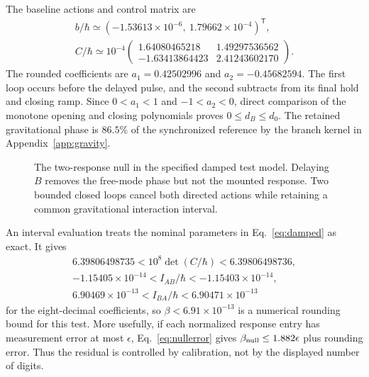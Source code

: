 The baseline actions and control matrix are
\begin{equation}
\begin{gathered}
b/\hbar\simeq(-1.53613\times10^{-6},\ 1.79662\times10^{-4})^{\mathsf T},\\
C/\hbar\simeq10^{-4}
\begin{pmatrix}
1.64080465218&1.49297536562\\
-1.63413864423&2.41243602170
\end{pmatrix}.
\end{gathered}
\label{eq:nullmatrix}
\end{equation}
The rounded coefficients are $a_1=0.42502996$ and $a_2=-0.45682594$. The first loop occurs before the delayed pulse, and the second subtracts from its final hold and closing ramp. Since $0<a_1<1$ and $-1<a_2<0$, direct comparison of the monotone opening and closing polynomials proves $0\le d_B\le d_0$. The retained gravitational phase is $86.5\%$ of the synchronized reference by the branch kernel in Appendix~\ref{app:gravity}.

\begin{figure}[t]
\centering
{}
\caption{The two-response null in the specified damped test model. Delaying $B$ removes the free-mode phase but not the mounted response. Two bounded closed loops cancel both directed actions while retaining a common gravitational interaction interval.}
\label{fig:nullpulses}
\end{figure}

An interval evaluation treats the nominal parameters in Eq.~\eqref{eq:damped} as exact. It gives
\begin{equation}
\begin{gathered}
6.39806498735<10^8\det(C/\hbar)<6.39806498736,\\
-1.15405\times10^{-14}<I_{AB}/\hbar<-1.15403\times10^{-14},\\
6.90469\times10^{-13}<I_{BA}/\hbar<6.90471\times10^{-13}
\end{gathered}
\label{eq:nullintervals}
\end{equation}
for the eight-decimal coefficients, so $\beta<6.91\times10^{-13}$ is a numerical rounding bound for this test. More usefully, if each normalized response entry has measurement error at most $\epsilon$, Eq.~\eqref{eq:nullerror} gives $\beta_{\rm null}\le1.882\epsilon$ plus rounding error. Thus the residual is controlled by calibration, not by the displayed number of digits.

